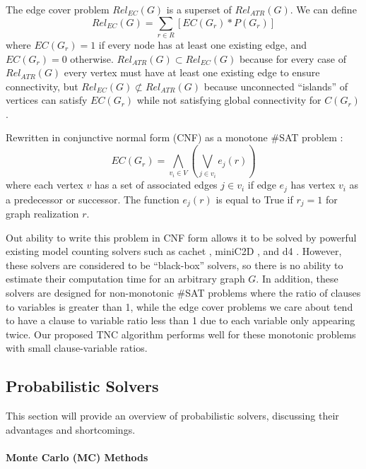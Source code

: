 The edge cover problem \(Rel_{EC}(G)\) is a superset of \(Rel_{ATR}(G)\). We can define \[Rel_{EC}(G) = \sum_{r \in R} [EC(G_r)*P(G_r)]\] where \(EC(G_r)=1\) if every node has at least one existing edge, and \(EC(G_r)=0\) otherwise. \(Rel_{ATR}(G) \subset Rel_{EC}(G)\) because for every case of \(Rel_{ATR}(G)\) every vertex must have at least one existing edge to ensure connectivity, but \(Rel_{EC}(G) \not\subset Rel_{ATR}(G)\) because unconnected ``islands'' of vertices can satisfy \(EC(G_r)\) while not satisfying global connectivity for \(C(G_r)\).

Rewritten in conjunctive normal form (CNF) as a monotone \#SAT problem \cite{roth1996hardness} \cite{vaisman2015model}: \[EC(G_r) = \bigwedge_{v_i \in V} (\bigvee_{j \in v_i} e_j(r))\] where each vertex \(v\) has a set of associated edges \(j \in v_i\) if edge \(e_j\) has vertex \(v_i\) as a predecessor or successor. The function \(e_j(r)\) is equal to True if \(r_j=1\) for graph realization \(r\).

Out ability to write this problem in CNF form allows it to be solved by powerful existing model counting solvers such as cachet \cite{sang2005heuristics}, miniC2D \cite{oztok2015top}, and d4 \cite{lagniez2017improved}. However, these solvers are considered to be ``black-box'' solvers, so there is no ability to estimate their computation time for an arbitrary graph \(G\). In addition, these solvers are designed for non-monotonic \#SAT problems where the ratio of clauses to variables is greater than 1, while the edge cover problems we care about tend to have a clause to variable ratio less than 1 due to each variable only appearing twice. Our proposed TNC algorithm performs well for these monotonic problems with small clause-variable ratios.

\hypertarget{probabilistic-solvers}{%
\subsection{Probabilistic Solvers}\label{probabilistic-solvers}}

This section will provide an overview of probabilistic solvers, discussing their advantages and shortcomings.

\hypertarget{monte-carlo-mc-methods}{%
\paragraph{\texorpdfstring{Monte Carlo (MC) Methods\\
}{Monte Carlo (MC) Methods }}\label{monte-carlo-mc-methods}}

